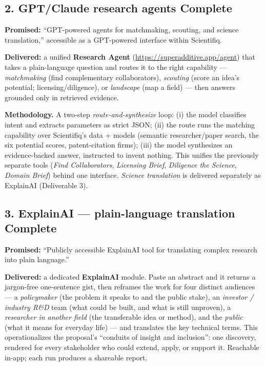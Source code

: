 \documentclass[11pt]{article}
\newcommand{\stDone}{\textbf{\textcolor{good}{Complete}}}
\begin{document}
\subsection{2. GPT/Claude research agents \hfill \stDone}
\textbf{Promised:} ``GPT-powered agents for matchmaking, scouting, and science
translation,'' accessible as a GPT-powered interface within Scientifiq.

\textbf{Delivered:} a unified \textbf{Research Agent} (\url{https://superadditive.app/agent})
that takes a plain-language question and routes it to the right capability ---
\emph{matchmaking} (find complementary collaborators), \emph{scouting} (score an
idea's potential; licensing/diligence), or \emph{landscape} (map a field) --- then
answers grounded only in retrieved evidence.

\textbf{Methodology.} A two-step \emph{route-and-synthesize} loop: (i) the model
classifies intent and extracts parameters as strict JSON; (ii) the route runs the
matching capability over Scientifiq's data + models (semantic researcher/paper
search, the six potential scores, patent-citation firms); (iii) the model
synthesizes an evidence-backed answer, instructed to invent nothing. This unifies
the previously separate tools (\emph{Find Collaborators}, \emph{Licensing Brief},
\emph{Diligence the Science}, \emph{Domain Brief}) behind one interface.
\emph{Science translation} is delivered separately as ExplainAI (Deliverable 3).

\subsection{3. ExplainAI --- plain-language translation \hfill \stDone}
\textbf{Promised:} ``Publicly accessible ExplainAI tool for translating complex
research into plain language.''

\textbf{Delivered:} a dedicated \textbf{ExplainAI} module. Paste an abstract and it
returns a jargon-free one-sentence gist, then reframes the work for four distinct
audiences --- a \emph{policymaker} (the problem it speaks to and the public stake),
an \emph{investor / industry R\&D} team (what could be built, and what is still
unproven), a \emph{researcher in another field} (the transferable idea or method),
and the \emph{public} (what it means for everyday life) --- and translates the key
technical terms. This operationalizes the proposal's ``conduits of insight and
inclusion'': one discovery, rendered for every stakeholder who could extend, apply,
or support it. Reachable in-app; each run produces a shareable report.
\end{document}
